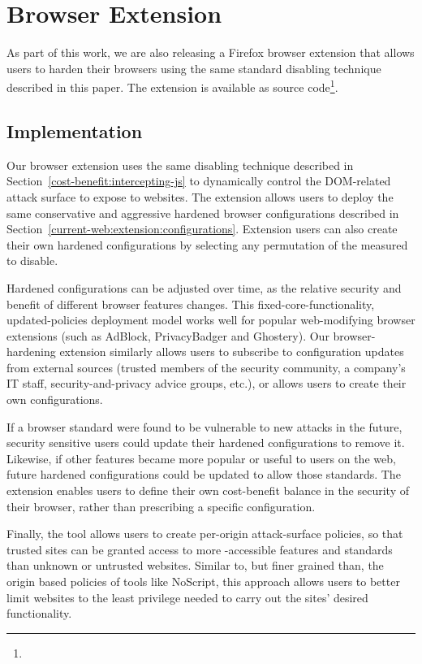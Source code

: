 \section{Browser Extension}
\label{current-web:extension}

As part of this work, we are also releasing a Firefox browser extension
that allows users to harden their browsers using the same standard
disabling technique described in this paper.  The extension is available
as source code\footnote{\ExtensionSourceUrl}.

\subsection{Implementation}
Our browser extension uses the same \WAS disabling technique described in
Section~\ref{cost-benefit:intercepting-js} to dynamically control the DOM-related
attack surface to expose to websites.  The extension allows users to
deploy the same conservative and aggressive hardened browser configurations
described in Section~\ref{current-web:extension:configurations}.
Extension users can also create their own hardened configurations by selecting
any permutation of the \NumStandards measured \WASs to disable.

Hardened configurations can be adjusted over time, as the
relative security and benefit of different browser features changes.  This
fixed-core-functionality, updated-policies deployment model works well
for popular web-modifying browser extensions (such as AdBlock, PrivacyBadger and
Ghostery).  Our browser-hardening extension similarly allows users to subscribe
to configuration updates from external sources (trusted members of the security
community, a company's IT staff, security-and-privacy advice groups, etc.), or
allows users to create their own configurations.

If a browser standard were found to be vulnerable to new attacks in the future,
security sensitive users could update their hardened configurations to remove it.
Likewise, if other features became more popular or useful to users on the web,
future hardened configurations could be updated to allow those standards.
The extension enables users to define their own cost-benefit balance in the security
of their browser, rather than prescribing a specific configuration.

Finally, the tool allows users to create per-origin attack-surface policies,
so that trusted sites can be granted access to more \JS-accessible
features and standards than unknown or untrusted websites.  Similar to, but
finer grained than, the origin based policies of tools like NoScript, this
approach allows users to better limit websites to the least privilege
needed to carry out the sites' desired functionality.

